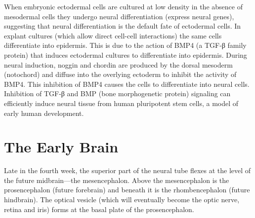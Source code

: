 When embryonic ectodermal cells are cultured at low density in the absence of mesodermal cells they undergo neural differentiation (express neural genes), suggesting that neural differentiation is the default fate of ectodermal cells. In explant cultures (which allow direct cell-cell interactions) the same cells differentiate into epidermis. This is due to the action of BMP4 (a TGF-β family protein) that induces ectodermal cultures to differentiate into epidermis. During neural induction, noggin and chordin are produced by the dorsal mesoderm (notochord) and diffuse into the overlying ectoderm to inhibit the activity of BMP4. This inhibition of BMP4 causes the cells to differentiate into neural cells. Inhibition of TGF-β and BMP (bone morphogenetic protein) signaling can efficiently induce neural tissue from human pluripotent stem cells, a model of early human development.

\hypertarget{the-early-brain}{%
\section{The Early Brain}\label{the-early-brain}}

Late in the fourth week, the superior part of the neural tube flexes at the level of the future midbrain---the mesencephalon. Above the mesencephalon is the prosencephalon (future forebrain) and beneath it is the rhombencephalon (future hindbrain). The optical vesicle (which will eventually become the optic nerve, retina and iris) forms at the basal plate of the prosencephalon.



